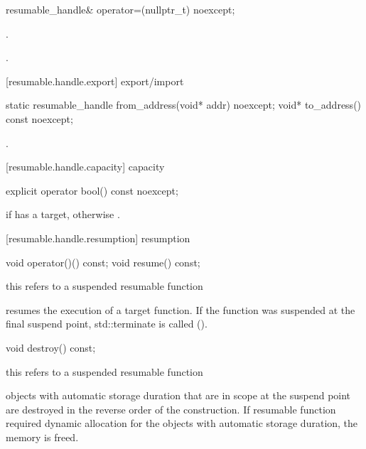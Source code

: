 \begin{itemdecl}
  resumable_handle& operator=(nullptr_t) noexcept;
\end{itemdecl}
\begin{itemdescr}
	\pnum\postconditions {}.
  
  \pnum\returns {}.
\end{itemdescr}

[resumable.handle.export]{ export/import}
\begin{itemdecl}
  static resumable_handle from_address(void* addr) noexcept;		
  void* to_address() const noexcept;
\end{itemdecl}

\begin{itemdescr}
  \pnum
  \postconditions {}.
\end{itemdescr}

[resumable.handle.capacity]{ capacity}
\begin{itemdecl}
  explicit operator bool() const noexcept;
\end{itemdecl}

\begin{itemdescr}
  \pnum
  \returns {} if  has a target, otherwise .
\end{itemdescr}

[resumable.handle.resumption]{ resumption}
\begin{itemdecl}
  void operator()() const;
  void resume() const;	
\end{itemdecl}
\begin{itemdescr}
  \pnum
  \precondition *this refers to a suspended resumable function
  
  \pnum
  \effects resumes the execution of a target function. If the function was suspended
  at the final suspend point, std::terminate is called ().
\end{itemdescr}

\begin{itemdecl}
  void destroy() const;
\end{itemdecl}
\begin{itemdescr}
  \pnum
  \precondition *this refers to a suspended resumable function
  
  \pnum
  \effects objects with automatic storage duration that are in scope
  at the suspend point are destroyed in the reverse order of the construction. If resumable function required dynamic allocation
  for the objects with automatic storage duration, the memory
  is freed.
\end{itemdescr}


